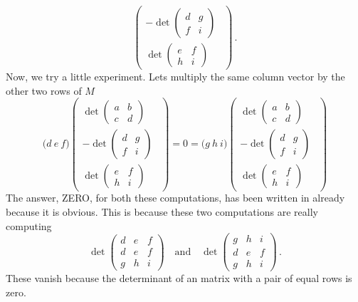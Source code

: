 {$$\begin{pmatrix}
-\det\begin{pmatrix}d&g\\f&i\end{pmatrix}\ \ \\[2mm]
\det\begin{pmatrix}e&f\\h&i\end{pmatrix}\end{pmatrix}\, .
$$
Now, we try a little experiment. Lets multiply the same column vector by the other two rows of $M$
$$
 \Big( d \ e \ f \Big)
\begin{pmatrix} \det\begin{pmatrix}a&b\\c&d\end{pmatrix}\\[2mm]
-\det\begin{pmatrix}d&g\\f&i\end{pmatrix}\ \ \\[2mm]
\det\begin{pmatrix}e&f\\h&i\end{pmatrix}\end{pmatrix} = 0 =
 \Big( g \ h \ i \Big)
\begin{pmatrix} \det\begin{pmatrix}a&b\\c&d\end{pmatrix}\\[2mm]
-\det\begin{pmatrix}d&g\\f&i\end{pmatrix}\ \ \\[2mm]
\det\begin{pmatrix}e&f\\h&i\end{pmatrix}\end{pmatrix}
$$
The answer, ZERO, for both these computations, has been written in already because it is obvious. This is because these two computations are really computing
$$
\det\begin{pmatrix}
d &e&f\\d&e&f\\g&h&i\end{pmatrix}
\quad\mbox{and} \quad \det\begin{pmatrix}
g &h&i\\d&e&f\\g&h&i\end{pmatrix}\, .
$$
These vanish because the determinant of an matrix with a pair of equal rows is zero.
}
